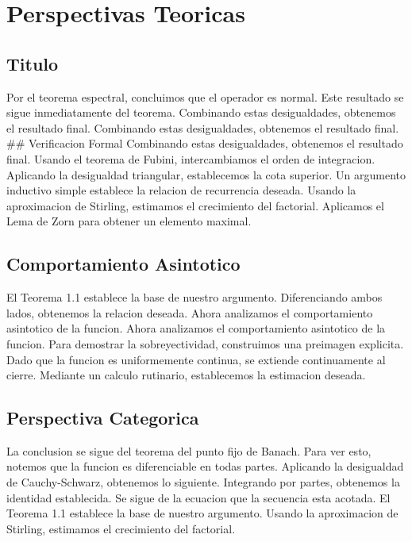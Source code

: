 \documentclass[
]{article}
\author{}
\date{}
\begin{document}
\section{Perspectivas Teoricas}\label{perspectivas-teoricas}

\subsection{Titulo}\label{titulo}

Por el teorema espectral, concluimos que el operador es normal. Este
resultado se sigue inmediatamente del teorema. Combinando estas
desigualdades, obtenemos el resultado final. Combinando estas
desigualdades, obtenemos el resultado final. \#\# Verificacion Formal
Combinando estas desigualdades, obtenemos el resultado final. Usando el
teorema de Fubini, intercambiamos el orden de integracion. Aplicando la
desigualdad triangular, establecemos la cota superior. Un argumento
inductivo simple establece la relacion de recurrencia deseada. Usando la
aproximacion de Stirling, estimamos el crecimiento del factorial.
Aplicamos el Lema de Zorn para obtener un elemento maximal.

\subsection{Comportamiento Asintotico}\label{comportamiento-asintotico}

El Teorema 1.1 establece la base de nuestro argumento. Diferenciando
ambos lados, obtenemos la relacion deseada. Ahora analizamos el
comportamiento asintotico de la funcion. Ahora analizamos el
comportamiento asintotico de la funcion. Para demostrar la
sobreyectividad, construimos una preimagen explicita. Dado que la
funcion es uniformemente continua, se extiende continuamente al cierre.
Mediante un calculo rutinario, establecemos la estimacion deseada.

\subsection{Perspectiva Categorica}\label{perspectiva-categorica}

La conclusion se sigue del teorema del punto fijo de Banach. Para ver
esto, notemos que la funcion es diferenciable en todas partes. Aplicando
la desigualdad de Cauchy-Schwarz, obtenemos lo siguiente. Integrando por
partes, obtenemos la identidad establecida. Se sigue de la ecuacion que
la secuencia esta acotada. El Teorema 1.1 establece la base de nuestro
argumento. Usando la aproximacion de Stirling, estimamos el crecimiento
del factorial.
\end{document}
